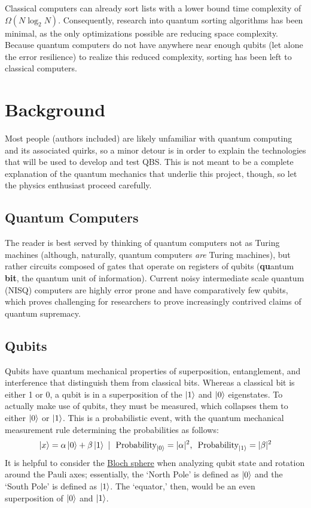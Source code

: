 \documentclass[12pt]{article}
\begin{document}
Classical computers can already sort lists with a lower bound time complexity of $\Omega (N \log_2 N)$. Consequently, research into quantum sorting algorithms has been minimal, as the only optimizations possible are reducing space complexity. Because quantum computers do not have anywhere near enough qubits (let alone the error resilience) to realize this reduced complexity, sorting has been left to classical computers.

\section{Background}
Most people (authors included) are likely unfamiliar with quantum computing and its associated quirks, so a minor detour is in order to explain the technologies that will be used to develop and test QBS. This is not meant to be a complete explanation of the quantum mechanics that underlie this project, though, so let the physics enthusiast proceed carefully.

\subsection{Quantum Computers}
The reader is best served by thinking of quantum computers not as Turing machines (although, naturally, quantum computers \textit{are} Turing machines), but rather circuits composed of gates that operate on registers of qubits (\textbf{qu}antum \textbf{bit}, the quantum unit of information). Current noisy intermediate scale quantum (NISQ) computers are highly error prone and have comparatively few qubits, which proves challenging for researchers to prove increasingly contrived claims of quantum supremacy.
\subsection{Qubits}
Qubits have quantum mechanical properties of superposition, entanglement, and interference that distinguish them from classical bits. Whereas a classical bit is either 1 or 0, a qubit is in a superposition of the $\ket{1}$ and $\ket{0}$ eigenstates.
To actually make use of qubits, they must be measured, which collapses them to either $\ket{0}$ or $\ket{1}$. This is a probabilistic event, with the quantum mechanical measurement rule determining the probabilities as follows:
$$ \ket{x} = \alpha \ket{0} + \beta \ket{1} \ | \ \text{ Probability}_{\ket{0}} = | \alpha |^2 \text{, } \text{ Probability}_{\ket{1}} = | \beta |^2 $$
It is helpful to consider the \hyperref[fig:bsphere]{Bloch sphere} when analyzing qubit state and rotation around the Pauli axes; essentially, the `North Pole' is defined as $\ket{0}$ and the `South Pole' is defined as $\ket{1}$. The `equator,' then, would be an even superposition of $\ket{0}$ and $\ket{1}$.
\end{document}
